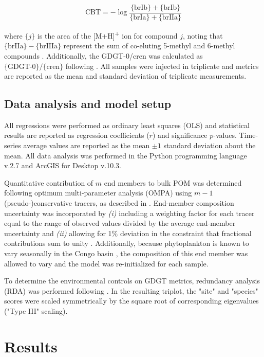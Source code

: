 \begin{equation}\label{Ch5Eq:3}
	\text{CBT} = -\log \frac{\{\text{brIb}\} + \{\text{brIb}\}}{\{\text{brIa}\} + \{\text{brIIa}\}}
\end{equation}

where $\{j\}$ is the area of the [M+H]\textsuperscript{+} ion for compound $j$, noting that $\{\text{brIIa}\} - \{\text{brIIIa}\}$ represent the sum of co-eluting 5-methyl and 6-methyl compounds \citep{DeJonge:2014kw}. Additionally, the GDGT-0/cren was calculated as $\{\text{GDGT-0}\}/\{\text{cren}\}$ following \citet{Blaga:2009ge}. All samples were injected in triplicate and metrics are reported as the mean and standard deviation of triplicate measurements.

\subsection{Data analysis and model setup}

All regressions were performed as ordinary least squares (OLS) and statistical results are reported as regression coefficients ($r$) and significance $p$-values. Time-series average values are reported as the mean $\pm 1$ standard deviation about the mean. All data analysis was performed in the Python programming language v.2.7 and ArcGIS for Desktop v.10.3.

Quantitative contribution of $m$ end members to bulk POM was determined following optimum multi-parameter analysis (OMPA) using $m-1$ (pseudo-)conservative tracers, as described in \citet{Glover:2011uh}. End-member composition uncertainty was incorporated by \textit{(i)} including a weighting factor for each tracer equal to the range of observed values divided by the average end-member uncertainty and \textit{(ii)} allowing for 1\% deviation in the constraint that fractional contributions sum to unity \citep{Glover:2011uh}. Additionally, because phytoplankton  is known to vary seasonally in the Congo basin \citep{Bouillon:2014ko}, the composition of this end member was allowed to vary and the model was re-initialized for each sample.

To determine the environmental controls on GDGT metrics, redundancy analysis (RDA) was performed following \citet{Legendre:1998tt}. In the resulting triplot, the "site" and "species" scores were scaled symmetrically by the square root of corresponding eigenvalues ("Type III" scaling).

\section{Results}

